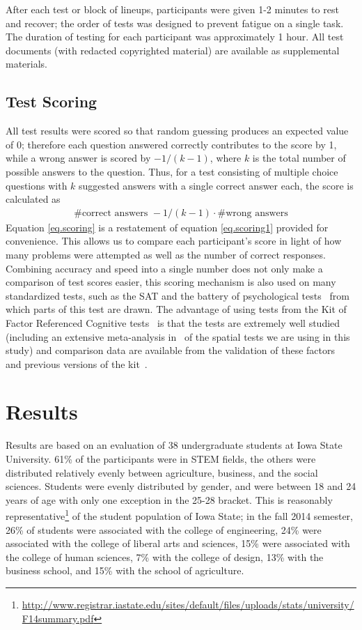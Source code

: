 \documentclass[journal]{vgtc}\usepackage[]{graphicx}\usepackage[]{color}
\begin{document}
After each test or block of lineups, participants were given 1-2 minutes to rest and recover; the order of tests was designed to prevent fatigue on a single task. The duration of testing for each participant was approximately 1 hour. All test documents (with redacted copyrighted material) are available as supplemental materials. 

\subsection{Test Scoring}\label{sec:scaling}
%
All test results were scored so that random guessing produces an expected value of 0; therefore each question answered correctly contributes to the score by 1, while a wrong answer is scored by $-1/(k-1)$, where $k$ is the total number of possible answers to the question. Thus, for a test consisting of multiple choice questions with $k$ suggested answers with a single correct answer each, the score is calculated as
\begin{eqnarray}\label{eq.scoring}
\# \text{correct answers } - 1/(k-1) \cdot \# \text{wrong answers}
\end{eqnarray}
Equation \ref{eq.scoring} is a restatement of equation \ref{eq.scoring1} provided for convenience.
This allows us to compare each participant's score in light of how many problems were attempted as well as the number of correct responses. Combining accuracy and speed into a single number does not only make a comparison of test scores easier,  this scoring mechanism is also used on many standardized tests, such as the SAT and the battery of psychological tests~\cite{diamond1973correction, ekstrom1976manual} from which parts of this test are drawn. The advantage of using tests from the Kit of Factor Referenced Cognitive tests~\cite{ekstrom1976manual} is that the tests are extremely well studied (including an extensive meta-analysis in~\cite{voyer1995magnitude} of the spatial tests we are using in this study) and comparison data are available from the validation of these factors~\cite{schaie1998longitudinal,hampson1990variations,mayer1994whom} and previous versions of the kit~\cite{educational1963kit}.


\section{Results}\label{sec:results}
Results are based on an evaluation of 38 undergraduate students at Iowa State University. 61\% of the participants were in STEM fields, the others were distributed relatively evenly between agriculture, business, and the social sciences. Students were evenly distributed by gender, and were between 18 and 24 years of age with only one exception in the 25-28 bracket. This is reasonably representative\footnote{\url{http://www.registrar.iastate.edu/sites/default/files/uploads/stats/university/F14summary.pdf}} of the student population of Iowa State; in the fall 2014 semester, 26\% of students were associated with the college of engineering, 24\% were associated with the college of liberal arts and sciences, 15\% were associated with the college of human sciences, 7\% with the college of design, 13\% with the business school, and 15\% with the school of agriculture.  
\end{document}

